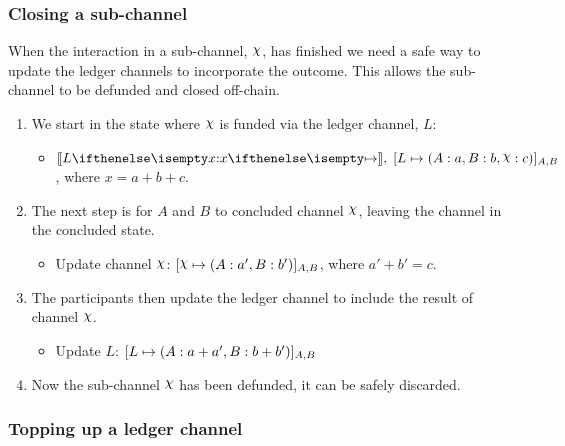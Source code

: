 \documentclass{article}
\begin{document}
\subsubsection{Closing a sub-channel}

When the interaction in a sub-channel, $\rchi$, has finished we need a safe way to update the ledger channels to incorporate the outcome.
This allows the sub-channel to be defunded and closed off-chain.
\begin{enumerate}
  \item We start in the state where $\rchi$ is funded via the ledger channel, $L$:
  \begin{itemize}
    \item $\adj{\holds{L}{x}{}}, \; \finalizable{L}{\alloc{A: a, B: b, \rchi: c}}{A, B}$, where $x = a + b + c$.
  \end{itemize}
  \item The next step is for $A$ and $B$ to concluded channel $\rchi$, leaving the channel in the concluded state.
  \begin{itemize}
    \item Update channel $\rchi$: $\finalizable{\rchi}{\alloc{A:a', B:b'}}{A,B}$, where $a' + b' = c$.
  \end{itemize}
  \item The participants then update the ledger channel to include the result of channel $\rchi$.
  \begin{itemize}
    \item Update $L$: $[L \mapsto ( A: a+ a', B: b + b' )]_{A, B}$
  \end{itemize}
  \item Now the sub-channel $\rchi$ has been defunded, it can be safely discarded.
\end{enumerate}

\subsubsection{Topping up a ledger channel}
\end{document}
